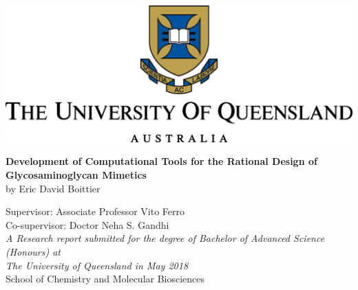 \documentclass[a4paper, 12pt, openany]{book}
\begin{document}
\begin{titlepage}
\begin{center}

\vspace*{3cm}
\renewcommand{\thefootnote}{\fnsymbol{footnote}}

\includegraphics[]{Pictures/PNGLogo.png}
\vspace{0.2cm}


\vspace{2cm}
\textbf{\LARGE{Development of Computational Tools for the Rational Design of Glycosaminoglycan Mimetics}} \\

by Eric David Boittier \\

\vspace{0.5cm}

Supervisor: Associate Professor Vito Ferro
\\
Co-supervisor: Doctor Neha S. Gandhi
\\
\vspace{3cm}
\textit{A	Research report submitted for	the	degree	of	Bachelor of	Advanced Science	(Honours)	at
\\ The	University	of	Queensland	in	May	2018}
\\School	of	Chemistry	and	Molecular	Biosciences
\end{center}
\end{titlepage}


\newpage



	
\end{document}

